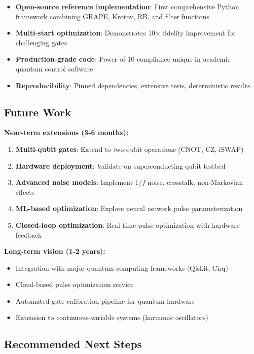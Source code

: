 \documentclass[11pt,a4paper]{article}
\theoremstyle{definition}
\theoremstyle{remark}
\begin{document}
\begin{itemize}
    \item \textbf{Open-source reference implementation}: First comprehensive Python framework combining GRAPE, Krotov, RB, and filter functions
    \item \textbf{Multi-start optimization}: Demonstrates 10× fidelity improvement for challenging gates
    \item \textbf{Production-grade code}: Power-of-10 compliance unique in academic quantum control software
    \item \textbf{Reproducibility}: Pinned dependencies, extensive tests, deterministic results
\end{itemize}

\subsection{Future Work}

\textbf{Near-term extensions (3-6 months):}

\begin{enumerate}
    \item \textbf{Multi-qubit gates}: Extend to two-qubit operations (CNOT, CZ, iSWAP)
    \item \textbf{Hardware deployment}: Validate on superconducting qubit testbed
    \item \textbf{Advanced noise models}: Implement $1/f$ noise, crosstalk, non-Markovian effects
    \item \textbf{ML-based optimization}: Explore neural network pulse parameterization
    \item \textbf{Closed-loop optimization}: Real-time pulse optimization with hardware feedback
\end{enumerate}

\textbf{Long-term vision (1-2 years):}

\begin{itemize}
    \item Integration with major quantum computing frameworks (Qiskit, Cirq)
    \item Cloud-based pulse optimization service
    \item Automated gate calibration pipeline for quantum hardware
    \item Extension to continuous-variable systems (harmonic oscillators)
\end{itemize}

\subsection{Recommended Next Steps}
\end{document}
